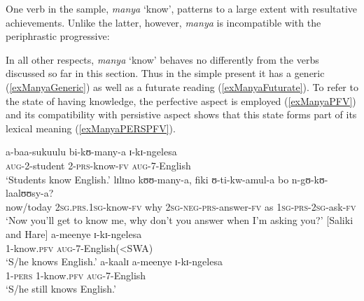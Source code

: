 \begin{exe}
\ex \begin{xlist}
\end{xlist}
\end{exe}

One verb in the sample, \textit{manya} \lq know', patterns to a large extent with resultative achievements. Unlike the latter, however, \textit{manya} is incompatible with the periphrastic progressive:
\begin{exe}
\end{exe}

In all other respects, \textit{manya} \lq know' behaves no differently from the verbs discussed so far in this section. Thus in the simple present it has a generic (\ref{exManyaGeneric}) as well as a futurate reading (\ref{exManyaFuturate}). To refer to the state of having knowledge, the perfective aspect is employed (\ref{exManyaPFV}) and its compatibility with persistive aspect shows that this state forms part of its lexical meaning (\ref{exManyaPERSPFV}).

\begin{exe}
\ex \label{exManyaGeneric}
\gll a-baa-sukuulu bi-kʊ-many-a ɪ-kɪ-ngelesa\\
\textsc{aug}-2-student 2-\textsc{prs}-know-\textsc{fv} \textsc{aug}-7-English\\
\glt \lq Students know English.'
\ex \label{exManyaFuturate}
\gll lɪlɪno kʊʊ-many-a, fiki ʊ-ti-kw-amul-a bo n-gʊ-kʊ-laalʊʊsy-a?\\
now/today \textsc{2sg.prs.1sg}-know-\textsc{fv} why \textsc{2sg}-\textsc{neg}-\textsc{prs}-answer-\textsc{fv} as \textsc{1sg}-\textsc{prs}-\textsc{2sg}-ask-\textsc{fv}\\
\glt \lq Now you'll get to know me, why don't you answer when I'm asking you?' [Saliki and Hare]
\ex \label{exManyaPFV} \gll a-meenye ɪ-kɪ-ngelesa\\
1-know.\textsc{pfv} \textsc{aug}-7-English(<SWA)\\
\glt \lq S/he knows English.'
\ex \label{exManyaPERSPFV}\gll a-kaalɪ a-meenye ɪ-kɪ-ngelesa\\
1-\textsc{pers} 1-know.\textsc{pfv} \textsc{aug}-7-English\\
\glt \lq S/he still knows English.'
\end{exe}

